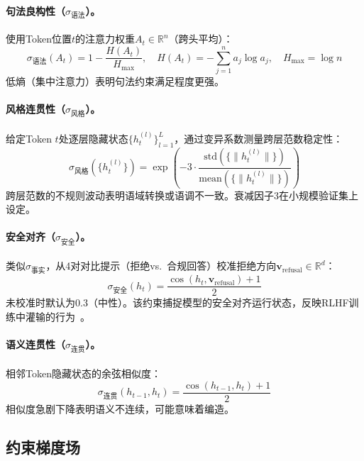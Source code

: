 \documentclass[11pt]{ctexart}
\begin{document}
\paragraph{句法良构性（$\sigma_{\text{语法}}$）。}
使用Token位置$t$的注意力权重$A_t \in \mathbb{R}^n$（跨头平均）：
\begin{equation}
\sigma_{\text{语法}}(A_t) = 1 - \frac{H(A_t)}{H_{\max}}, \quad H(A_t) = -\sum_{j=1}^{n} a_j \log a_j, \quad H_{\max} = \log n
\end{equation}
低熵（集中注意力）表明句法约束满足程度更强。

\paragraph{风格连贯性（$\sigma_{\text{风格}}$）。}
给定Token $t$处逐层隐藏状态$\{h_t^{(l)}\}_{l=1}^{L}$，通过变异系数测量跨层范数稳定性：
\begin{equation}
\sigma_{\text{风格}}(\{h_t^{(l)}\}) = \exp\left(-3 \cdot \frac{\text{std}(\{\|h_t^{(l)}\|\})}{\text{mean}(\{\|h_t^{(l)}\|\})}\right)
\end{equation}
跨层范数的不规则波动表明语域转换或语调不一致。衰减因子3在小规模验证集上设定。

\paragraph{安全对齐（$\sigma_{\text{安全}}$）。}
类似$\sigma_{\text{事实}}$，从4对对比提示（拒绝vs.\ 合规回答）校准拒绝方向$\mathbf{v}_{\text{refusal}} \in \mathbb{R}^d$：
\begin{equation}
\sigma_{\text{安全}}(h_t) = \frac{\cos(h_t, \mathbf{v}_{\text{refusal}}) + 1}{2}
\end{equation}
未校准时默认为0.3（中性）。该约束捕捉模型的安全对齐运行状态，反映RLHF训练中灌输的行为~\cite{ouyang2022training}。

\paragraph{语义连贯性（$\sigma_{\text{连贯}}$）。}
相邻Token隐藏状态的余弦相似度：
\begin{equation}
\sigma_{\text{连贯}}(h_{t-1}, h_t) = \frac{\cos(h_{t-1}, h_t) + 1}{2}
\end{equation}
相似度急剧下降表明语义不连续，可能意味着编造。

\subsection{约束梯度场}
\end{document}
